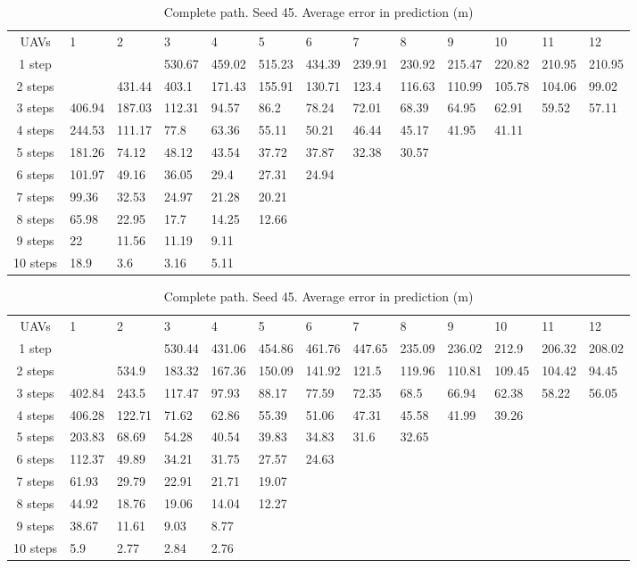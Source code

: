 \documentclass[10pt,a4paper]{book}
\begin{document}
\newpage

\begin{landscape}

\begin{table}[h]
\centering
\caption{Complete path. Seed 44. Average error in prediction (m)}
\begin{tabular}{c|l|l|l|l|l|l|l|l|l|l|l|l}
UAVs & 1 & 2 & 3 & 4 & 5 & 6 & 7 & 8 & 9 & 10 & 11 & 12 \\
1 step&&&530.67&459.02&515.23&434.39&239.91&230.92&215.47&220.82&210.95&210.95\\
2 steps&&431.44&403.1&171.43&155.91&130.71&123.4&116.63&110.99&105.78&104.06&99.02\\
3 steps&406.94&187.03&112.31&94.57&86.2&78.24&72.01&68.39&64.95&62.91&59.52&57.11\\
4 steps&244.53&111.17&77.8&63.36&55.11&50.21&46.44&45.17&41.95&41.11&&\\
5 steps&181.26&74.12&48.12&43.54&37.72&37.87&32.38&30.57&&&&\\
6 steps&101.97&49.16&36.05&29.4&27.31&24.94&&&&&&\\
7 steps&99.36&32.53&24.97&21.28&20.21&&&&&&&\\
8 steps&65.98&22.95&17.7&14.25&12.66&&&&&&&\\
9 steps&22&11.56&11.19&9.11&&&&&&&&\\
10 steps&18.9&3.6&3.16&5.11&&&&&&&&\\

\end{tabular}
\label{TAB_CP_RES_44}
\vspace{0.1em}
\centering
\caption{Complete path. Seed 45. Average error in prediction (m)}
\begin{tabular}{c|l|l|l|l|l|l|l|l|l|l|l|l}
UAVs  & 1  & 2 & 3  & 4 & 5 & 6 & 7 & 8 & 9 & 10 & 11 & 12  \\
1 step&&&530.44&431.06&454.86&461.76&447.65&235.09&236.02&212.9&206.32&208.02\\
2 steps&&534.9&183.32&167.36&150.09&141.92&121.5&119.96&110.81&109.45&104.42&94.45\\
3 steps&402.84&243.5&117.47&97.93&88.17&77.59&72.35&68.5&66.94&62.38&58.22&56.05\\
4 steps&406.28&122.71&71.62&62.86&55.39&51.06&47.31&45.58&41.99&39.26&&\\
5 steps&203.83&68.69&54.28&40.54&39.83&34.83&31.6&32.65&&&&\\
6 steps&112.37&49.89&34.21&31.75&27.57&24.63&&&&&&\\
7 steps&61.93&29.79&22.91&21.71&19.07&&&&&&&\\
8 steps&44.92&18.76&19.06&14.04&12.27&&&&&&&\\
9 steps&38.67&11.61&9.03&8.77&&&&&&&&\\
10 steps&5.9&2.77&2.84&2.76&&&&&&&& \\


\end{tabular}
\label{TAB_CP_RES_45}
\end{table}

\newpage


\end{landscape}
\restoregeometry
\end{document}
